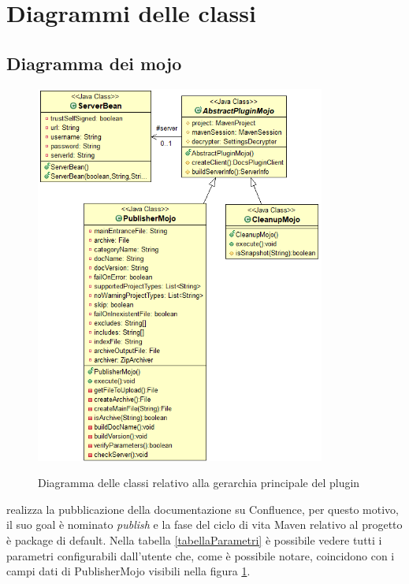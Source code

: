 \clearpage


\section{Diagrammi delle classi}
\label{sec:diagrammi-classi}

\subsection{Diagramma dei mojo} \label{diagrammiMojo}

\begin{figure}[H]
    \centering
    \includegraphics[width=0.85\textwidth]{immagini/mojo-gerarchy.png}\\
    \caption{Diagramma delle classi relativo alla gerarchia principale del plugin}
    \label{diagrammaMojo}
\end{figure}

 realizza la pubblicazione della documentazione su Confluence, per questo motivo, il suo goal è nominato \emph{publish} e la fase del ciclo di vita Maven relativo al progetto è package di default.
Nella tabella \ref{tabellaParametri} è possibile vedere tutti i parametri configurabili dall'utente che, come è possibile notare, coincidono con i campi dati di PublisherMojo visibili nella figura \ref{diagrammaMojo}.

